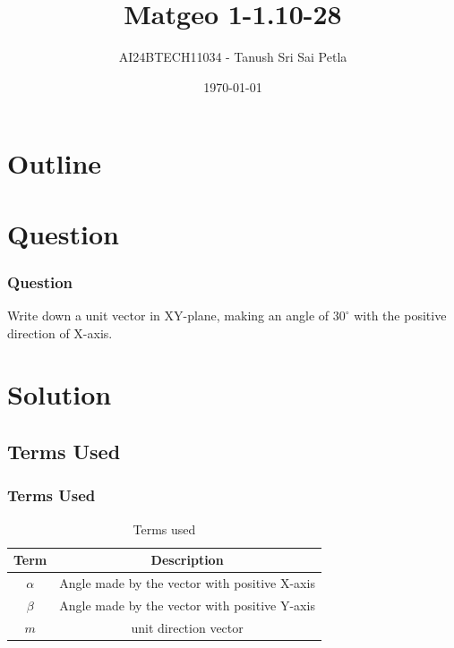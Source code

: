 \documentclass{beamer}
\title{Matgeo 1-1.10-28}
\author{AI24BTECH11034 - Tanush Sri Sai Petla}
\date{\today}
\newcommand{\degree}{^{\circ}}
\theoremstyle{remark}
\numberwithin{equation}{section}
\begin{document}
\begin{frame}
\titlepage
\end{frame}

\section*{Outline}
\begin{frame}
\tableofcontents
\end{frame}

\section{Question}
\begin{frame}
\frametitle{Question}

Write down a unit vector in XY-plane, making an angle of $30\degree$ with the positive direction of X-axis.
\end{frame}

\section{Solution}
\subsection{Terms Used}
\begin{frame}
\frametitle{Terms Used}
\begin{table}[htbp]
    \centering
    \caption{Terms used}
    \label{tab:parameters}
    \begin{tabular}[12ptx]{ |c| c|}
    \hline\textbf{Term} & \textbf{Description}\\
    \hline
    $\alpha$&Angle made by the vector with positive X-axis \\
    \hline
    $\beta$&Angle made by the vector with positive Y-axis \\
    \hline
    $m$&unit direction vector\\
    \hline
    \end{tabular}
\end{table}
\end{frame}
\end{document}
